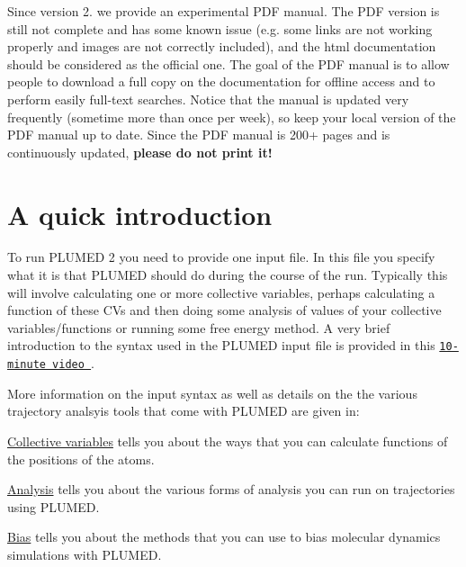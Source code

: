 Since version 2. we provide an experimental P\+D\+F manual. The P\+D\+F version is still not complete and has some known issue (e.\+g. some links are not working properly and images are not correctly included), and the html documentation should be considered as the official one. The goal of the P\+D\+F manual is to allow people to download a full copy on the documentation for offline access and to perform easily full-\/text searches. Notice that the manual is updated very frequently (sometime more than once per week), so keep your local version of the P\+D\+F manual up to date. Since the P\+D\+F manual is 200+ pages and is continuously updated, {\bfseries  please do not print it! }\hypertarget{index_qintro}{}\section{A quick introduction}\label{index_qintro}
To run P\+L\+U\+M\+E\+D 2 you need to provide one input file. In this file you specify what it is that P\+L\+U\+M\+E\+D should do during the course of the run. Typically this will involve calculating one or more collective variables, perhaps calculating a function of these C\+Vs and then doing some analysis of values of your collective variables/functions or running some free energy method. A very brief introduction to the syntax used in the P\+L\+U\+M\+E\+D input file is provided in this \href{http://www.youtube.com/watch?v=PxJP16qNCYs}{\tt 10-\/minute video }.

More information on the input syntax as well as details on the the various trajectory analsyis tools that come with P\+L\+U\+M\+E\+D are given in\+:


\begin{DoxyItemize}
\item \hyperlink{colvarintro}{Collective variables} tells you about the ways that you can calculate functions of the positions of the atoms.
\item \hyperlink{_analysis}{Analysis} tells you about the various forms of analysis you can run on trajectories using P\+L\+U\+M\+E\+D.
\item \hyperlink{_bias}{Bias} tells you about the methods that you can use to bias molecular dynamics simulations with P\+L\+U\+M\+E\+D.
\end{DoxyItemize}


